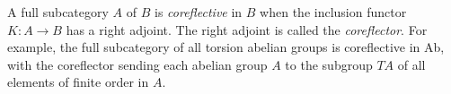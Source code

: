 A full subcategory $A$ of $B$ is \emph{coreflective} in $B$ when the inclusion functor $K: A \to B$ has a right adjoint. The right adjoint is called the \emph{coreflector}. For example, the full subcategory of all torsion abelian groups is coreflective in Ab, with the coreflector sending each abelian group $A$ to the subgroup $TA$ of all elements of finite order in $A$.
